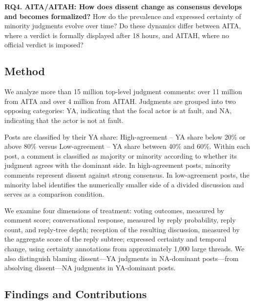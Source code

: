 \textbf{RQ4. AITA/AITAH: How does dissent change as consensus develops and becomes formalized?}
How do the prevalence and expressed certainty of minority judgments evolve over time? Do these dynamics differ between AITA, where a verdict is formally displayed after 18 hours, and AITAH, where no official verdict is imposed?


\subsection{Method}
We analyze more than 15 million top-level judgment comments: over 11 million from AITA and over 4 million from AITAH. Judgments are grouped into two opposing categories: YA, indicating that the focal actor is at fault, and NA, indicating that the actor is not at fault.

Posts are classified by their YA share:
High-agreement -- YA share below 20\% or above 80\% versus Low-agreement -- YA share between 40\% and 60\%.
Within each post, a comment is classified as majority or minority according to whether its judgment agrees with the dominant side. In high-agreement posts, minority comments represent dissent against strong consensus. In low-agreement posts, the minority label identifies the numerically smaller side of a divided discussion and serves as a comparison condition.

We examine four dimensions of treatment:
voting outcomes, measured by comment score;
conversational response, measured by reply probability, reply count, and reply-tree depth;
reception of the resulting discussion, measured by the aggregate score of the reply subtree;
expressed certainty and temporal change, using certainty annotations from approximately 1,000 large threads.
We also distinguish blaming dissent—YA judgments in NA-dominant posts—from absolving dissent—NA judgments in YA-dominant posts.

\subsection{Findings and Contributions}

